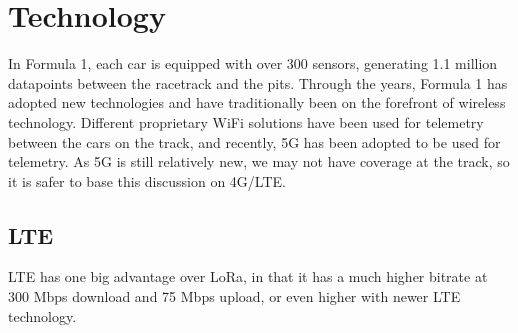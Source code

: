 \section{Technology}
In Formula 1, each car is equipped with over 300 sensors, generating 1.1 million datapoints between the racetrack and the pits\cite{DCFrontier}. Through the years, Formula 1 has adopted new technologies and have traditionally been on the forefront of wireless technology. Different proprietary WiFi solutions have been used for telemetry between the cars on the track, and recently, 5G has been adopted to be used for telemetry\cite{FastCompany}. As 5G is still relatively new, we may not have coverage at the track, so it is safer to base this discussion on 4G/LTE.

\subsection{LTE}
LTE has one big advantage over LoRa, in that it has a much higher bitrate at 300 Mbps download and 75 Mbps upload, or even higher with newer LTE technology\cite{MobilePDF}. 
